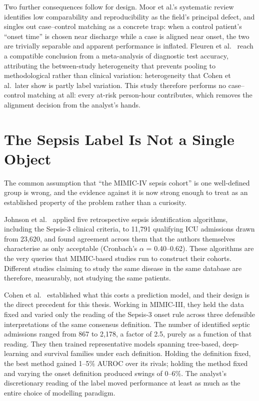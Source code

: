Two further consequences follow for design. Moor et al.'s systematic review
\cite{moor2021review} identifies low comparability and reproducibility as the
field's principal defect, and singles out case--control matching as a concrete
trap: when a control patient's ``onset time'' is chosen near discharge while a
case is aligned near onset, the two are trivially separable and apparent
performance is inflated. Fleuren et al.\ \cite{fleuren2020ml} reach a
compatible conclusion from a meta-analysis of diagnostic test accuracy,
attributing the between-study heterogeneity that prevents pooling to
methodological rather than clinical variation: heterogeneity that Cohen et
al.\ later show is partly label variation. This study therefore performs no
case--control matching at all: every at-risk person-hour contributes, which
removes the alignment decision from the analyst's hands.


\section{The Sepsis Label Is Not a Single Object}
\label{sec:label_object}

The common assumption that ``the MIMIC-IV sepsis cohort'' is one well-defined
group is wrong, and the evidence against it is now strong enough to treat as an
established property of the problem rather than a curiosity.

Johnson et al.\ \cite{johnson2018comparative} applied five retrospective sepsis
identification algorithms, including the Sepsis-3 clinical criteria, to
11,791 qualifying ICU admissions drawn from 23,620, and found agreement across
them that the authors themselves characterise as only acceptable (Cronbach's
$\alpha$ = 0.40--0.62). These algorithms are the very queries that MIMIC-based
studies run to construct their cohorts. Different studies claiming to study the
same disease in the same database are therefore, measurably, not studying the
same patients.

Cohen et al.\ \cite{cohen2024subtle} established what this costs a prediction
model, and their design is the direct precedent for this thesis. Working in
MIMIC-III, they held the data fixed and varied only the reading of the
Sepsis-3 onset rule across three defensible interpretations of the same
consensus definition. The number of identified septic admissions ranged from
867 to 2,178, a factor of 2.5, purely as a function of that reading. They
then trained representative models spanning tree-based, deep-learning and
survival families under each definition. Holding the definition fixed, the best
method gained 1--5\% AUROC over its rivals; holding the method fixed and
varying the onset definition produced swings of 0--6\%. The analyst's
discretionary reading of the label moved performance at least as much as the
entire choice of modelling paradigm.

